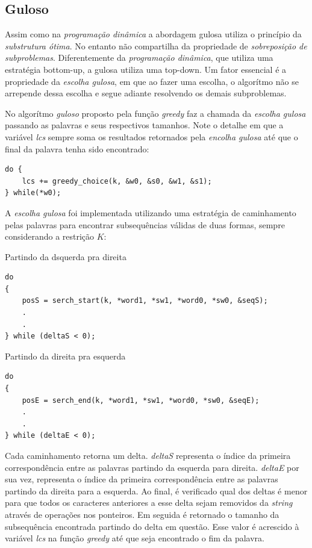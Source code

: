 \subsection{Guloso}

Assim como na \emph{programação dinâmica} a abordagem gulosa utiliza
o princípio da \emph{substrutura ótima}. No entanto não compartilha 
da propriedade de \emph{sobreposição de subproblemas}. Diferentemente
da \emph{programação dinâmica}, que utiliza uma estratégia bottom-up, 
a gulosa utiliza uma top-down. Um fator essencial é a propriedade da
\emph{escolha gulosa}, em que ao fazer uma escolha, o algorítmo não 
se arrepende dessa escolha e segue adiante resolvendo os demais 
subproblemas.

No algorítmo \emph{guloso} proposto pela função {\it greedy} faz a chamada
da \emph{escolha gulosa} passando as palavras e seus respectivos tamanhos.
Note o detalhe em que a variável {\it lcs} sempre soma os resultados 
retornados pela \emph{encolha gulosa} até que o final da palavra tenha
sido encontrado:

\begin{lstlisting}
do {
    lcs += greedy_choice(k, &w0, &s0, &w1, &s1);
} while(*w0);
\end{lstlisting}

A \emph{escolha gulosa} foi implementada utilizando uma estratégia
de caminhamento pelas palavras para encontrar subsequências válidas
de duas formas, sempre considerando a restrição $K$:

Partindo da dsquerda pra direita
\begin{lstlisting}
do
{
    posS = serch_start(k, *word1, *sw1, *word0, *sw0, &seqS);
    .
    .
} while (deltaS < 0);
\end{lstlisting}

Partindo da direita pra esquerda
\begin{lstlisting}
do
{
    posE = serch_end(k, *word1, *sw1, *word0, *sw0, &seqE);
    .
    .
} while (deltaE < 0);
\end{lstlisting}

Cada caminhamento retorna um delta. {\it deltaS} representa o índice
da primeira correspondência entre as palavras partindo da esquerda
para direita. {\it deltaE} por sua vez, representa o índice da 
primeira correspondência entre as palavras partindo da direita para
a esquerda. Ao final, é verificado qual dos deltas é menor para que 
todos os caracteres anteriores a esse delta sejam removidos da {\it string}
através de operações nos ponteiros. Em seguida é retornado o tamanho da 
subsequência encontrada partindo do delta em questão. Esse valor é acrescido
à variável {\it lcs} na função {\it greedy} até que seja encontrado o fim
da palavra.

